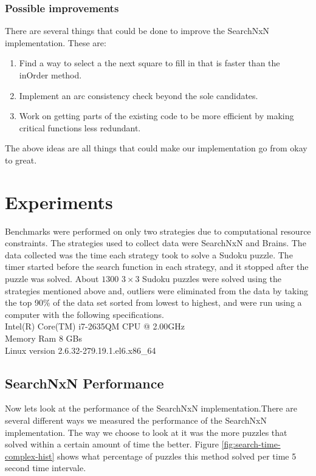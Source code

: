 \documentclass[letterpaper]{article}
\begin{document}
\subsubsection{Possible improvements}
There are several things that could be done to improve the SearchNxN implementation. These are:
\begin{enumerate}
\item Find a way to select a the next square to fill in that is faster than the inOrder method.
\item Implement an arc consistency check beyond the sole candidates.
\item Work on getting parts of the existing code to be more efficient by making critical functions less redundant. 
\end{enumerate}
The above ideas are all things that could make our implementation go from okay to great.

\section{Experiments}
Benchmarks were performed on only two strategies due to computational resource constraints. The strategies used to collect data were SearchNxN and Brains. The data collected was the time each strategy took to solve a Sudoku puzzle. The timer started before the search function in each strategy, and it stopped after the puzzle was solved. About $1300$ $3 \times 3$ Sudoku puzzles were solved using the strategies mentioned above and, outliers were eliminated from the data by taking the top 90\% of the data set sorted from lowest to highest, and were run using a computer with the following specifications.\\

Intel(R) Core(TM) i7-2635QM CPU @ 2.00GHz\\
\indent Memory Ram 8 GBs\\
\indent Linux version 2.6.32-279.19.1.el6.x86\_64

\subsection{SearchNxN Performance}
Now lets look at the performance of the SearchNxN implementation.There are several different ways we measured the performance of the SearchNxN implementation. The way we choose to look at it was the more puzzles that solved within a certain amount of time the better. Figure \ref{fig:search-time-complex-hist} shows what percentage of puzzles this method solved per time 5 second time intervale.
\end{document}

